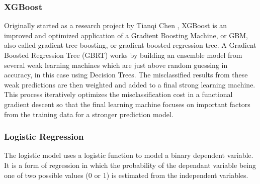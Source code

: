 \documentclass[review]{elsarticle}
\begin{document}




\subsubsection{XGBoost}
\label{xgboost}

Originally started as a research project by Tianqi Chen \cite{xgboost}, XGBoost is an improved and optimized application of a Gradient Boosting Machine, or GBM, also called gradient tree boosting, or gradient boosted regression tree. A Gradient Boosted Regression Tree (GBRT) works by building an ensemble model from several weak learning machines which are just above random guessing in accuracy, in this case using Decision Trees. The misclassified results from these weak predictions are then weighted and added to a final strong learning machine. This process iteratively optimizes the misclassification cost in a functional gradient descent so that the final learning machine focuses on important factors from the training data for a stronger prediction model. 


\subsubsection{Logistic Regression}
\label{logit_regression}

The logistic model \cite{logit} uses a logistic function to model a binary dependent variable. It is a form of regression in which the probability of the dependant variable being one of two possible values (0 or 1) is estimated from the independent variables. 
\end{document}
